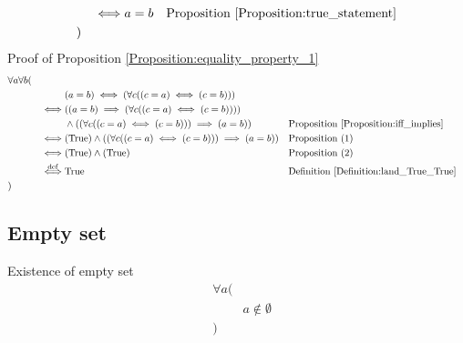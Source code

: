 \begin{prop}
\begin{align*}
& & \iff & a = b
& & \text{Proposition \ref{Proposition:true_statement}} \\
& )
\end{align*}
Proof of Proposition \ref{Proposition:equality_property_1}
\begin{align*}
& \forall a \forall b ( \\
& & & (a = b) \iff (\forall c ((c = a) \iff (c = b))) \\
& & \iff & ((a = b) \implies (\forall c ((c = a) \iff (c = b)))) \\
& & & \land ((\forall c ((c = a) \iff (c = b))) \implies (a = b))
& & \text{Proposition \ref{Proposition:iff_implies}} \\
& & \iff & (\text{True}) \land ((\forall c ((c = a) \iff (c = b))) \implies (a = b))
& & \text{Proposition (1)} \\
& & \iff & (\text{True}) \land (\text{True})
& & \text{Proposition (2)} \\
& & \overset{\operatorname{def}}{\iff} & \text{True}
& & \text{Definition \ref{Definition:land_True_True}} \\
& )
\end{align*}
\end{prop}

\subsection{Empty set}
\begin{axm}
\label{Axiom:existence_of_empty_set}
Existence of empty set
\begin{align*}
& \forall a ( \\
& & a \notin \emptyset \\
& )
\end{align*}
\end{axm}

